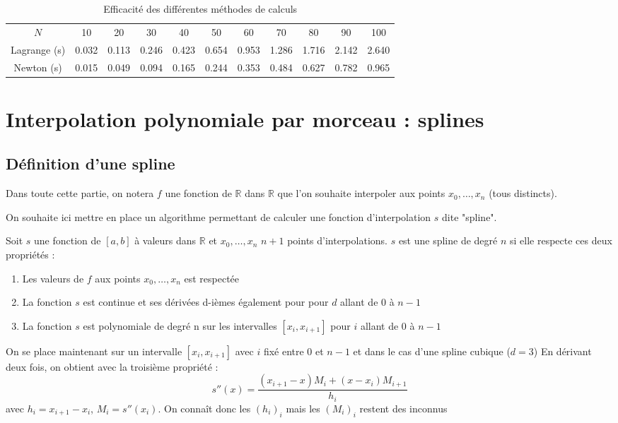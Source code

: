 \begin{table}[h]
  \centering
\begin{tabular}{ccccccccccc}
    $N$ & 10 & 20 & 30 & 40 & 50 & 60 & 70 & 80 & 90 & 100 \\
   Lagrange (s) & 0.032 & 0.113 & 0.246 & 0.423 & 0.654 & 0.953 & 1.286 & 1.716 & 2.142 & 2.640 \\
   Newton (s) & 0.015 & 0.049 & 0.094 & 0.165 & 0.244 & 0.353 & 0.484 & 0.627 & 0.782 & 0.965 \\
\end{tabular}
  \caption{Efficacité des différentes méthodes de calculs}
  \label{table:compNewtonLagrange}
\end{table}



\chapter{Interpolation polynomiale par morceau : splines}

\section{Définition d'une spline}

Dans toute cette partie, on notera $f$ une fonction de $\mathbb{R}$ 
dans $\mathbb{R}$ que l'on souhaite interpoler aux points 
$x_0, \dots, x_n$ (tous distincts).

On souhaite ici mettre en place un algorithme 
permettant de calculer une fonction d'interpolation $s$ dite "spline".

\begin{definition}
Soit $s$ une fonction de $[a,b]$ à valeurs dans $\mathbb{R}$ et 
$x_0, \dots, x_n$ $n+1$ points d'interpolations. $s$ est une spline de degré $n$ si elle respecte
ces deux propriétés :
\begin{enumerate}
\item Les valeurs de $f$ aux points $x_0, \dots, x_n$ est respectée
\item La fonction $s$ est continue et ses dérivées d-ièmes également pour pour $d$ allant de $0$ à $n-1$
\item La fonction $s$ est polynomiale de degré n sur les intervalles $[x_i,x_{i+1}]$ pour $i$ allant de $0$ à $n-1$
\end{enumerate}
\end{definition}

On se place maintenant sur un intervalle $[x_i,x_{i+1}]$ avec $i$ fixé entre 0 et $n-1$ et dans le cas d'une spline cubique ($d = 3$)
En dérivant deux fois, on obtient avec la troisième propriété :
\[
s''(x) = \frac{(x_{i+1} - x)M_i + (x - x_i)M_{i+1}}{h_i}
\]
avec $h_i = x_{i+1} - x_i$, $M_i = s''(x_i)$. On connaît donc les $(h_i)_i$ mais les $(M_i)_i$ restent des inconnus

